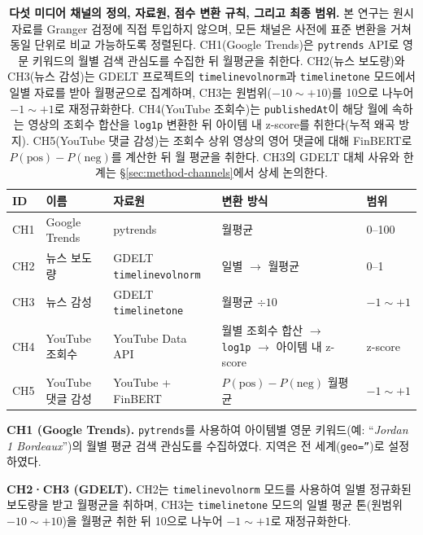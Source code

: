 \documentclass[11pt, a4paper, twocolumn]{article}
\begin{document}
\begin{table}[!tbp]
\centering\small
\caption[채널 정의 및 점수 변환]{\textbf{다섯 미디어 채널의 정의,
자료원, 점수 변환 규칙, 그리고 최종 범위.} 본 연구는 원시 자료를
Granger 검정에 직접 투입하지 않으며, 모든 채널은 사전에 표준 변환을
거쳐 동일 단위로 비교 가능하도록 정렬된다. CH1(Google Trends)은
\texttt{pytrends} API로 영문 키워드의 월별 검색 관심도를 수집한 뒤
월평균을 취한다. CH2(뉴스 보도량)와 CH3(뉴스 감성)는 GDELT 프로젝트의
\texttt{timelinevolnorm}과 \texttt{timelinetone} 모드에서 일별 자료를
받아 월평균으로 집계하며, CH3는 원범위($-10\sim+10$)를 10으로 나누어
$-1\sim+1$로 재정규화한다. CH4(YouTube 조회수)는 \texttt{publishedAt}이
해당 월에 속하는 영상의 조회수 합산을 \texttt{log1p} 변환한 뒤 아이템
내 z-score를 취한다(누적 왜곡 방지). CH5(YouTube 댓글 감성)는 조회수
상위 영상의 영어 댓글에 대해 FinBERT로 $P(\text{pos})-P(\text{neg})$를
계산한 뒤 월 평균을 취한다. CH3의 GDELT 대체 사유와 한계는
\S\ref{sec:method-channels}에서 상세 논의한다.}
\label{tab:channels}
\begin{tabular}{l l l p{4.5cm} l}
\toprule
ID & 이름 & 자료원 & 변환 방식 & 범위 \\
\midrule
CH1 & Google Trends     & pytrends                       & 월평균                                                         & 0--100 \\
CH2 & 뉴스 보도량        & GDELT \texttt{timelinevolnorm} & 일별 $\rightarrow$ 월평균                                      & 0--1 \\
CH3 & 뉴스 감성          & GDELT \texttt{timelinetone}    & 월평균 $\div 10$                                               & $-1\sim+1$ \\
CH4 & YouTube 조회수     & YouTube Data API               & 월별 조회수 합산 $\rightarrow$ \texttt{log1p} $\rightarrow$ 아이템 내 z-score & z-score \\
CH5 & YouTube 댓글 감성  & YouTube + FinBERT              & $P(\text{pos}) - P(\text{neg})$ 월평균                         & $-1\sim+1$ \\
\bottomrule
\end{tabular}
\end{table}

\textbf{CH1 (Google Trends).} \texttt{pytrends}를 사용하여 아이템별
영문 키워드(예: ``\textit{Jordan 1 Bordeaux}'')의 월별 평균 검색
관심도를 수집하였다. 지역은 전 세계(\texttt{geo=''})로 설정하였다.

\textbf{CH2·CH3 (GDELT).} CH2는 \texttt{timelinevolnorm} 모드를
사용하여 일별 정규화된 보도량을 받고 월평균을 취하며, CH3는
\texttt{timelinetone} 모드의 일별 평균 톤(원범위 $-10\sim+10$)을 월평균
취한 뒤 10으로 나누어 $-1\sim+1$로 재정규화한다.
\end{document}
